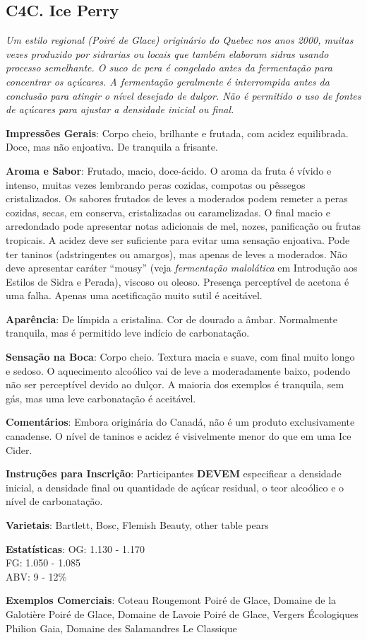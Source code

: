 \subsection*{C4C. Ice Perry}

\textit{Um estilo regional (\textit{Poiré de Glace}) originário do Quebec nos anos 2000, muitas vezes produzido por sidrarias ou locais que também elaboram sidras usando processo semelhante. O suco de pera é congelado antes da fermentação para concentrar os açúcares. A fermentação geralmente é interrompida antes da conclusão para atingir o nível desejado de dulçor. Não é permitido o uso de fontes de açúcares para ajustar a densidade inicial ou final.}

\textbf{Impressões Gerais}: Corpo cheio, brilhante e frutada, com acidez equilibrada. Doce, mas não enjoativa. De tranquila a frisante.

\textbf{Aroma e Sabor}: Frutado, macio, doce-ácido. O aroma da fruta é vívido e intenso, muitas vezes lembrando peras cozidas, compotas ou pêssegos cristalizados. Os sabores frutados de leves a moderados podem remeter a peras cozidas, secas, em conserva, cristalizadas ou caramelizadas. O final macio e arredondado pode apresentar notas adicionais de mel, nozes, panificação ou frutas tropicais. A acidez deve ser suficiente para evitar uma sensação enjoativa. Pode ter taninos (adstringentes ou amargos), mas apenas de leves a moderados. Não deve apresentar caráter “mousy” (veja \textit{fermentação malolática} em Introdução aos Estilos de Sidra e Perada), viscoso ou oleoso. Presença perceptível de acetona é uma falha. Apenas uma acetificação muito sutil é aceitável.

\textbf{Aparência}: De límpida a cristalina. Cor de dourado a âmbar. Normalmente tranquila, mas é permitido leve indício de carbonatação.

\textbf{Sensação na Boca}: Corpo cheio. Textura macia e suave, com final muito longo e sedoso. O aquecimento alcoólico vai de leve a moderadamente baixo, podendo não ser perceptível devido ao dulçor. A maioria dos exemplos é tranquila, sem gás, mas uma leve carbonatação é aceitável.

\textbf{Comentários}: Embora originária do Canadá, não é um produto exclusivamente canadense. O nível de taninos e acidez é visivelmente menor do que em uma Ice Cider.

\textbf{Instruções para Inscrição}: Participantes \textbf{DEVEM} especificar a densidade inicial, a densidade final ou quantidade de açúcar residual, o teor alcoólico e o nível de carbonatação.

\textbf{Varietais}: Bartlett, Bosc, Flemish Beauty, other table pears

\textbf{Estatísticas}: OG: 1.130 - 1.170 \\
\phantom{ } \hspace{16.5mm} FG: 1.050 - 1.085 \\
\phantom{ } \hspace{16.5mm} ABV: 9 - 12\%

\textbf{Exemplos Comerciais}: Coteau Rougemont Poiré de Glace, Domaine de la Galotière Poiré de Glace, Domaine de Lavoie Poiré de Glace, Vergers Écologiques Philion Gaia, Domaine des Salamandres Le Classique
